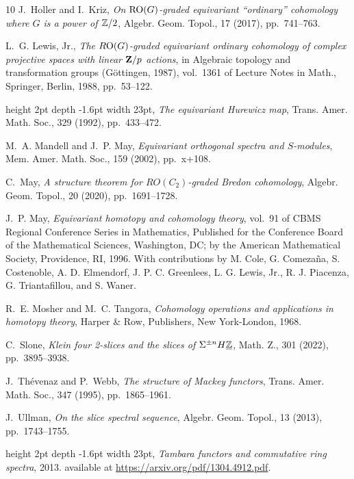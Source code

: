 \documentclass[a4paper,leqno,11pt]{amsart}
\theoremstyle{plain}
\theoremstyle{definition}
\theoremstyle{remark}
\theoremstyle{definition}
\numberwithin{equation}{section}
\begin{document}
\begin{thebibliography}{10}
{\sc J.~Holler and I.~Kriz}, {\em On {${\rm RO}(G)$}-graded equivariant
  ``ordinary'' cohomology where {$G$} is a power of {${\Bbb Z}/2$}}, Algebr.
  Geom. Topol., 17 (2017), pp.~741--763.

{\sc L.~G. Lewis, Jr.}, {\em The {$R{\rm O}(G)$}-graded equivariant ordinary
  cohomology of complex projective spaces with linear {${\bf Z}/p$} actions},
  in Algebraic topology and transformation groups ({G}\"{o}ttingen, 1987),
  vol.~1361 of Lecture Notes in Math., Springer, Berlin, 1988, pp.~53--122.

\leavevmode\vrule height 2pt depth -1.6pt width 23pt, {\em The equivariant
  {H}urewicz map}, Trans. Amer. Math. Soc., 329 (1992), pp.~433--472.

{\sc M.~A. Mandell and J.~P. May}, {\em Equivariant orthogonal spectra and
  {$S$}-modules}, Mem. Amer. Math. Soc., 159 (2002), pp.~x+108.

{\sc C.~May}, {\em A structure theorem for {$RO(C_2)$}-graded {B}redon
  cohomology}, Algebr. Geom. Topol., 20 (2020), pp.~1691--1728.

{\sc J.~P. May}, {\em Equivariant homotopy and cohomology theory}, vol.~91 of
  CBMS Regional Conference Series in Mathematics, Published for the Conference
  Board of the Mathematical Sciences, Washington, DC; by the American
  Mathematical Society, Providence, RI, 1996.
\newblock With contributions by M. Cole, G. Comeza\~{n}a, S. Costenoble, A. D.
  Elmendorf, J. P. C. Greenlees, L. G. Lewis, Jr., R. J. Piacenza, G.
  Triantafillou, and S. Waner.

{\sc R.~E. Mosher and M.~C. Tangora}, {\em Cohomology operations and
  applications in homotopy theory}, Harper \& Row, Publishers, New York-London,
  1968.

{\sc C.~Slone}, {\em Klein four 2-slices and the slices of {$\Sigma^{\pm
  n}H\underline{\Bbb Z}$}}, Math. Z., 301 (2022), pp.~3895--3938.

{\sc J.~Th\'{e}venaz and P.~Webb}, {\em The structure of {M}ackey functors},
  Trans. Amer. Math. Soc., 347 (1995), pp.~1865--1961.

{\sc J.~Ullman}, {\em On the slice spectral sequence}, Algebr. Geom. Topol., 13
  (2013), pp.~1743--1755.

\leavevmode\vrule height 2pt depth -1.6pt width 23pt, {\em Tambara functors and
  commutative ring spectra}, 2013.
\newblock available at \url{https://arxiv.org/pdf/1304.4912.pdf}.


\end{thebibliography}
\end{document}
